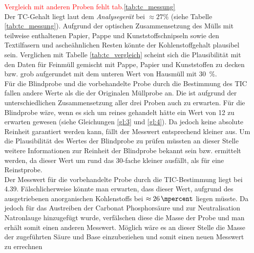 \textcolor{red}{Vergleich mit anderen Proben fehlt tab.\ref{tab:tc_messung}}\\
Der TC-Gehalt liegt laut dem \textit{Analysegerät} bei $\approx 27\%$ (siehe Tabelle \ref{tab:tc_messung}). Aufgrund der optischen Zusammensetzung des Mülls mit teilweise enthaltenen Papier, Pappe und Kunststoffschnipseln sowie den Textilfasern und ascheähnlichen Resten könnte der Kohlenstoffgehalt plausibel sein. Verglichen mit Tabelle \ref{tab:tc_vergleich} \cite[S.11]{HansGunterRamke.} scheint sich die Plausibilität mit den Daten für Feinmüll gemischt mit Pappe, Papier und Kunststoffen zu decken bzw. grob aufgerundet mit dem unteren Wert von Hausmüll mit \SI{30}{\percent}.\\
Für die Blindprobe und die vorbehandelte Probe durch die Bestimmung des TIC fallen andere Werte als die der Originalen Müllprobe an. Die ist aufgrund der unterschiedlichen Zusammensetzung aller drei Proben auch zu erwarten. Für die Blindprobe wäre, wenn es sich um reines  gehandelt hätte ein Wert von \SI{12}{\mpercent} zu erwarten gewesen (siehe Gleichungen \ref{gl:3} und \ref{gl:4}). Da jedoch keine absolute Reinheit garantiert werden kann, fällt der Messwert entsprechend kleiner aus. Um die Plausibilität des Wertes der Blindprobe zu prüfen müssten an dieser Stelle weitere Informationen zur Reinheit der Blindprobe bekannt sein bzw. ermittelt werden, da dieser Wert um rund das 30-fache kleiner ausfällt, als für eine Reinstprobe.\\
Der Messwert für die vorbehandelte Probe durch die TIC-Bestimmung liegt bei \SI{4,39}{\mpercent}. Fälschlicherweise könnte man erwarten, dass dieser Wert, aufgrund des ausgetriebenen anorganischen Kohlenstoffs bei $\approx \SI{26}{\mpercent}$ liegen müsste. Da jedoch für das Austreiben der Carbonat Phosphorsäure und zur Neutralisation Natronlauge hinzugefügt wurde, verfälschen diese die Masse der Probe und man erhält somit einen anderen Messwert. Möglich wäre es an dieser Stelle die Masse der zugeführten Säure und Base einzubeziehen und somit einen neuen Messwert zu errechnen 
\vspace*{-3.5mm}
\renewcommand{\arraystretch}{1.2}
